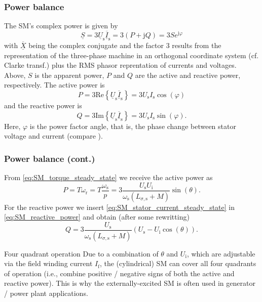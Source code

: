 \begin{frame}
	\frametitle{Power balance} 
	The SM's complex power is given by 
	\begin{equation}
			\underline{S}= 3\underline{U}_\mathrm{s} \overline{\underline{I}}_\mathrm{s} =  3(P + \mathrm{j}Q) = 3S e^{\mathrm{j}\varphi} 
	\end{equation}
	with $\overline{\underline{X}}$ being the complex conjugate and the factor $3$ results from the representation of the three-phase machine in an orthogonal coordinate system (cf. Clarke transf.) plus the RMS phasor reprentation of currents and voltages. Above, $S$ is the apparent power, $P$ and $Q$ are the active and reactive power, respectively. The active power is
	\begin{equation}
		P = 3\mathrm{Re}\left\{ \underline{U}_\mathrm{s} \overline{\underline{I}}_\mathrm{s}\right\} = 3 U_\mathrm{s} I_\mathrm{s} \cos(\varphi)
	\end{equation}
	and the reactive power is
	\begin{equation}
		Q = 3\mathrm{Im}\left\{\underline{U}_\mathrm{s} \overline{\underline{I}}_\mathrm{s}\right\} = 3 U_\mathrm{s} I_\mathrm{s} \sin(\varphi).
		\label{eq:SM_reactive_power}
	\end{equation}
	Here, $\varphi$ is the power factor angle, that is, the phase change between stator voltage and current (compare ). 
\end{frame}

\begin{frame}
	\frametitle{Power balance (cont.)} 
	From \eqref{eq:SM_torque_steady_state} we receive the active power as
	\begin{equation}
		P = T \omega_\mathrm{r} = T \frac{\omega_\mathrm{s}}{p} = 3 \frac{U_\mathrm{s} U_\mathrm{i}}{\omega_\mathrm{s} \left(L_{\sigma,\mathrm{s}} + M\right)}  \sin(\theta).
	\end{equation} 
	For the reactive power we insert \eqref{eq:SM_stator_current_steady_state} in \eqref{eq:SM_reactive_power} and obtain (after some rewritting)
	\begin{equation}
		Q = 3 \frac{U_\mathrm{s}}{\omega_\mathrm{s} \left(L_{\sigma,\mathrm{s}} + M\right)} \left(U_\mathrm{s} - U_\mathrm{i} \cos(\theta) \right).
	\end{equation}
	\begin{varblock}{Four quadrant operation}
		Due to a combination of $\theta$ and $U_\mathrm{i}$, which are adjustable via the field winding current $I_\mathrm{f}$, the (cylindrical) SM can cover all four quadrants of operation (i.e., combine positive / negative signs of both the active and reactive power). This is why the externally-excited SM is often used in generator / power plant applications. 
	\end{varblock}
\end{frame}


